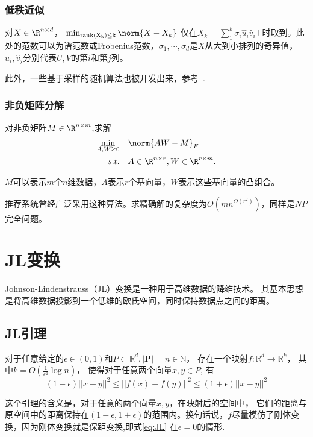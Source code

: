 \documentclass[lang=cn,newtx,10pt,scheme=chinese,chinesefont=nofont,citestyle=gb7714-2015, bibstyle=gb7714-2015]{elegantbook}
\begin{document}
\begin{refsection}
\subsubsection{低秩近似}
\begin{theorem}
对$X\in\R^{n\times d}$，
   $\min_{\mathrm{rank(X_k)\leq k}}\norm{X-X_k}$
仅在$X_k=\sum_1^k\sigma_i \hat{u}_i \hat{v}_i\top$时取到。此处的范数可以为谱范数或Frobenius范数，$\sigma_1,\cdots, \sigma_d$是$X$从大到小排列的奇异值，$\hat{u}_i,\hat v_j$分别代表$U,V$的第$i$和第$j$列。
\end{theorem}
此外，一些基于采样的随机算法也被开发出来，参考~\cite{TCS-060}.
\subsubsection{非负矩阵分解}
对非负矩阵$M\in\R^{n\times m}$,求解
\begin{align*}
    \min_{A,W\geq0}\quad&\norm{AW-M}_F\\
    s.t. \quad& A\in\R^{n\times r}, W\in\R^{r\times m}.
\end{align*}
\begin{example}
    $M$可以表示$m$个$n$维数据，$A$表示$r$个基向量，$W$表示这些基向量的凸组合。
\end{example}
推荐系统曾经广泛采用这种算法。求精确解的复杂度为$O(mn^{O(r^2)})$，同样是$NP$完全问题。
\section{JL变换}
Johnson-Lindenstrauss（JL）变换是一种用于高维数据的降维技术。
其基本思想是将高维数据投影到一个低维的欧氏空间，同时保持数据点之间的距离。

\subsection{JL引理}

\begin{theorem}[JL引理]
	对于任意给定的$\epsilon \in (0,1)$和$P \subset \mathbb{R}^d, |\mathbf{P}|=n \in \mathbb{N}$，
	存在一个映射$f:\mathbb{R}^d \rightarrow \mathbb{R}^k$，
	其中$k = O(\frac{1}{\epsilon^2} \log n)$，
	使得对于任意两个向量$x,y \in P$, 有
	\begin{equation}\label{eq:JL}
		(1-\epsilon) ||x-y||^2 \leq ||f(x) - f(y)||^2 \leq (1+\epsilon) ||x-y||^2
	\end{equation}
\end{theorem}


这个引理的含义是，对于任意的两个向量$x,y$，在映射后的空间中，
它们的距离与原空间中的距离保持在$(1-\epsilon,1+\epsilon)$的范围内。换句话说，$f$尽量模仿了刚体变换，因为刚体变换就是保距变换\cite{enwiki:1280547833},即式\eqref{eq:JL} 在$\epsilon=0$的情形.


\end{refsection}
\end{document}
